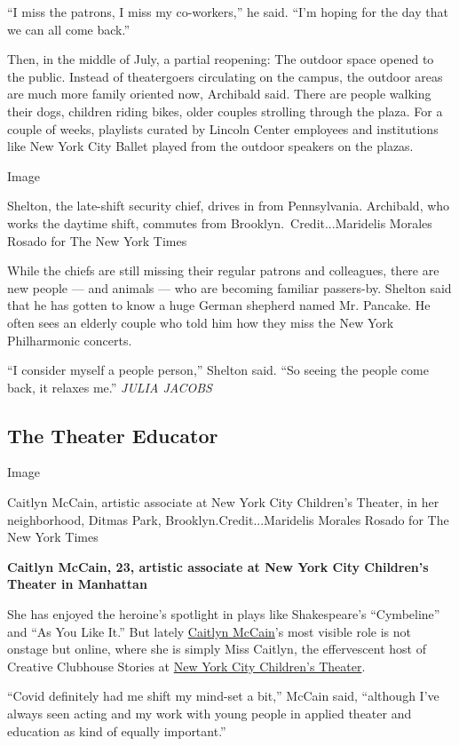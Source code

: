 ``I miss the patrons, I miss my co-workers,'' he said. ``I'm hoping for
the day that we can all come back.''

Then, in the middle of July, a partial reopening: The outdoor space
opened to the public. Instead of theatergoers circulating on the campus,
the outdoor areas are much more family oriented now, Archibald said.
There are people walking their dogs, children riding bikes, older
couples strolling through the plaza. For a couple of weeks, playlists
curated by Lincoln Center employees and institutions like New York City
Ballet played from the outdoor speakers on the plazas.

Image

Shelton, the late-shift security chief, drives in from Pennsylvania.
Archibald, who works the daytime shift, commutes from
Brooklyn.~Credit...Maridelis Morales Rosado for The New York Times

While the chiefs are still missing their regular patrons and colleagues,
there are new people --- and animals --- who are becoming familiar
passers-by. Shelton said that he has gotten to know a huge German
shepherd named Mr. Pancake. He often sees an elderly couple who told him
how they miss the New York Philharmonic concerts.

``I consider myself a people person,'' Shelton said. ``So seeing the
people come back, it relaxes me.'' \emph{JULIA JACOBS}

\hypertarget{the-theater-educator}{%
\subsection{The Theater Educator}\label{the-theater-educator}}

Image

Caitlyn McCain, artistic associate at New York City Children's Theater,
in her neighborhood, Ditmas Park, Brooklyn.Credit...Maridelis Morales
Rosado for The New York Times

\textbf{Caitlyn McCain, 23, artistic associate at New York City
Children's Theater in Manhattan}

She has enjoyed the heroine's spotlight in plays like Shakespeare's
``Cymbeline'' and ``As You Like It.'' But lately
\href{https://www.caitlynmccain.com/}{Caitlyn McCain}'s most visible
role is not onstage but online, where she is simply Miss Caitlyn, the
effervescent host of Creative Clubhouse Stories at
\href{https://nycchildrenstheater.org/}{New York City Children's
Theater}.

``Covid definitely had me shift my mind-set a bit,'' McCain said,
``although I've always seen acting and my work with young people in
applied theater and education as kind of equally important.''

